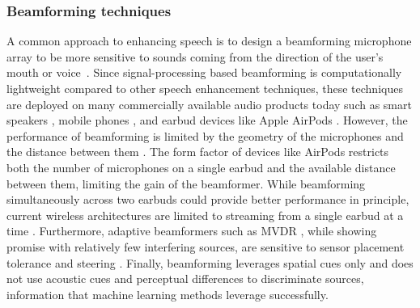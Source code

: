 \documentclass [11pt, proquest] {uwthesis}[2020/02/24]
\begin{document}
\subsubsection{Beamforming techniques} A common approach to enhancing speech is to design a beamforming microphone array to be more sensitive to sounds coming from the direction of the user's mouth \cite{van1988beamforming} or voice~\cite{dov-uist21}. Since signal-processing based beamforming is computationally lightweight compared to other speech enhancement techniques, these techniques are deployed on many commercially available audio products today such as smart speakers \cite{amazon}, mobile phones \cite{samsungglobalnewsroom_2014}, and earbud devices like Apple AirPods \cite{airpods}. However, the performance of beamforming is limited by the geometry of the microphones and the distance between them \cite{van1988beamforming, InvenSense}. The form factor of devices like AirPods restricts both the number of microphones on a single earbud and the available distance between them, limiting the gain of the beamformer. While beamforming simultaneously across two earbuds could provide better performance in principle, current wireless architectures are limited to streaming from a single earbud at a time \cite{bluetooth}. Furthermore, adaptive beamformers such as MVDR \cite{frost1972MVDR}, while showing promise with relatively few interfering sources,  are sensitive to sensor placement tolerance and steering \cite{zhang2017deep, brandstein2001microphone}. Finally, beamforming leverages spatial cues only and does not use acoustic cues and perceptual differences to discriminate sources, information that machine learning methods leverage successfully.






\end{document}

